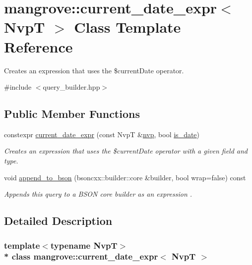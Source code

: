 \hypertarget{classmangrove_1_1current__date__expr}{}\section{mangrove\+:\+:current\+\_\+date\+\_\+expr$<$ NvpT $>$ Class Template Reference}
\label{classmangrove_1_1current__date__expr}


Creates an expression that uses the \$current\+Date operator.  




{\ttfamily \#include $<$query\+\_\+builder.\+hpp$>$}

\subsection*{Public Member Functions}
\begin{DoxyCompactItemize}
\item 
constexpr \hyperlink{classmangrove_1_1current__date__expr_a663fe4960f123c49753658fdc259ac6c}{current\+\_\+date\+\_\+expr} (const NvpT \&\hyperlink{classmangrove_1_1nvp}{nvp}, bool \hyperlink{structmangrove_1_1is__date}{is\+\_\+date})
\begin{DoxyCompactList}\small\item\em Creates an expression that uses the \$current\+Date operator with a given field and type. \end{DoxyCompactList}\item 
void \hyperlink{classmangrove_1_1current__date__expr_a105bbfe2eaacdd823188abc40f95b08c}{append\+\_\+to\+\_\+bson} (bsoncxx\+::builder\+::core \&builder, bool wrap=false) const 
\begin{DoxyCompactList}\small\item\em Appends this query to a B\+S\+ON core builder as an expression \textquotesingle{}. \end{DoxyCompactList}\end{DoxyCompactItemize}


\subsection{Detailed Description}
\subsubsection*{template$<$typename NvpT$>$\\*
class mangrove\+::current\+\_\+date\+\_\+expr$<$ Nvp\+T $>$}

